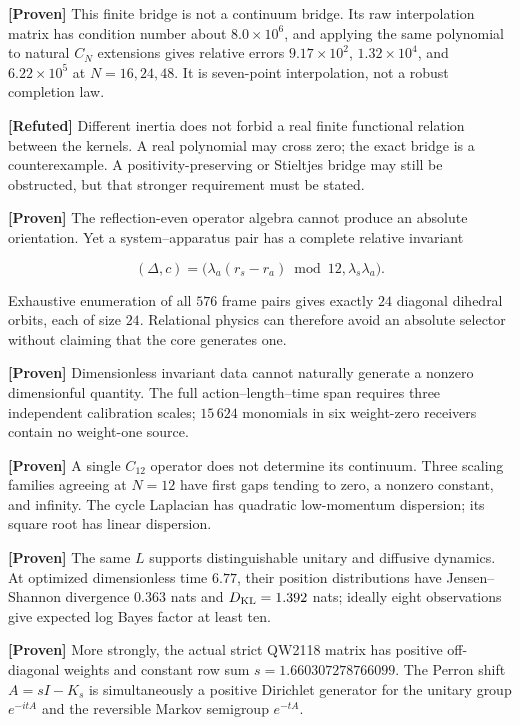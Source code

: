 \documentclass[11pt,a4paper,openany]{report}
\newcommand{\statusProven}{\textcolor{fingreen}{[Proven]}}
\newcommand{\statusRefuted}{\textcolor{finred}{[Refuted]}}
\begin{document}
\textbf{\statusProven{}} This finite bridge is not a continuum bridge. Its raw interpolation matrix has condition number about \(8.0\times10^6\), and applying the same polynomial to natural \(C_N\) extensions gives relative errors \(9.17\times10^2\), \(1.32\times10^4\), and \(6.22\times10^5\) at \(N=16,24,48\). It is seven-point interpolation, not a robust completion law.

\textbf{\statusRefuted{}} Different inertia does not forbid a real finite functional relation between the kernels. A real polynomial may cross zero; the exact bridge is a counterexample. A positivity-preserving or Stieltjes bridge may still be obstructed, but that stronger requirement must be stated.

\textbf{\statusProven{}} The reflection-even operator algebra cannot produce an absolute orientation. Yet a system–apparatus pair has a complete relative invariant

\[
(\Delta,c)=
\bigl(\lambda_a(r_s-r_a)\bmod12,\lambda_s\lambda_a\bigr).
\]

Exhaustive enumeration of all \(576\) frame pairs gives exactly \(24\) diagonal dihedral orbits, each of size \(24\). Relational physics can therefore avoid an absolute selector without claiming that the core generates one.

\textbf{\statusProven{}} Dimensionless invariant data cannot naturally generate a nonzero dimensionful quantity. The full action–length–time span requires three independent calibration scales; \(15\,624\) monomials in six weight-zero receivers contain no weight-one source.

\textbf{\statusProven{}} A single \(C_{12}\) operator does not determine its continuum. Three scaling families agreeing at \(N=12\) have first gaps tending to zero, a nonzero constant, and infinity. The cycle Laplacian has quadratic low-momentum dispersion; its square root has linear dispersion.

\textbf{\statusProven{}} The same \(L\) supports distinguishable unitary and diffusive dynamics. At optimized dimensionless time \(6.77\), their position distributions have Jensen–Shannon divergence \(0.363\) nats and \(D_{\rm KL}=1.392\) nats; ideally eight observations give expected log Bayes factor at least ten.

\textbf{\statusProven{}} More strongly, the actual strict QW2118 matrix has positive off-diagonal weights and constant row sum \(s=1.660307278766099\). The Perron shift \(A=sI-K_s\) is simultaneously a positive Dirichlet generator for the unitary group \(e^{-itA}\) and the reversible Markov semigroup \(e^{-tA}\).
\end{document}
